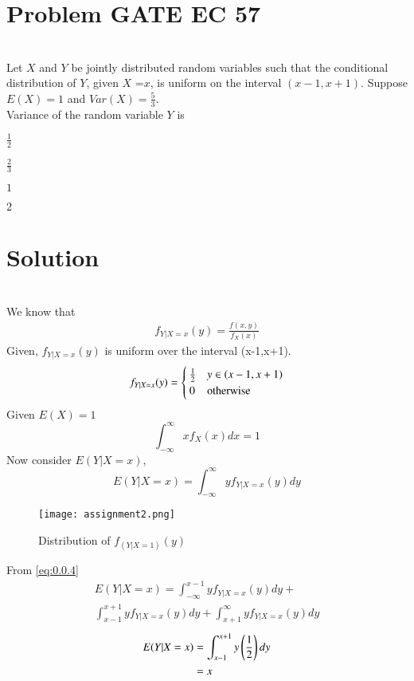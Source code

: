 \documentclass[journal,12pt,twocolumn]{IEEEtran}
\begin{document}
\section*{{Problem GATE EC 57}}\\
Let $X$ and $Y$ be jointly distributed random variables such that the conditional distribution of $Y$, given $X$ =$x$, is uniform on the interval $(x-1,x+1)$. Suppose $E(X)=1$ and $Var(X)=\frac{5}{3}$.
\\
 Variance of the random variable $Y$ is 
\begin{enumerate}[(A)]
\begin{multicols}{2}
\setlength\itemsep{1em}
\item $ \frac{1}{2}$\\
\item $\frac{2}{3}$\\
\item $1$\\
\item $2$
\end{multicols}
\end{enumerate}
\section*{{Solution}}\\
We know that
\begin{align}
    f_{Y|X=x}(y)=\frac{f(x,y)}{f_{X}(x)} \label{eq:0.0.1}
\end{align}
Given, $f_{Y|X=x}(y)$ is uniform over the interval (x-1,x+1).
\begin{align}
    f_{Y|X=x}(y)=
    \begin{cases}
    \frac{1}{2} & y \in \left(x-1,x+1\right)\\
    0 & \text{otherwise}
    \end{cases}\label{eq:0.0.2}
\end{align}
Given $E(X)=1$
\begin{equation}
    \int_{-\infty}^{\infty}x f_{X}(x)dx=1\label{eq:0.0.3}
\end{equation}
Now consider $E(Y|X=x)$,
\begin{equation}
    E(Y|X=x)=\int_{-\infty}^{\infty}y f_{Y|X=x}(y)dy \label{eq:0.0.4}
\end{equation}
\begin{figure}[H]
    \centering
    \texttt{[image: assignment2.png]}
    \caption{Distribution of $f_{(Y|X=1)}(y)$}
\end{figure}
From \eqref{eq:0.0.4}
\begin{multline}
     E(Y|X=x)=\int_{-\infty}^{x-1}yf_{Y|X=x}(y)dy+\\ \int_{x-1}^{x+1}yf_{Y|X=x}(y)dy+\int_{x+1}^{\infty}yf_{Y|X=x}(y)dy
\end{multline}
\begin{align}
     E(Y|X=x)&=\int_{x-1}^{x+1}y\left(\frac{1}{2}\right)dy\\
    &=x
\end{align}
\end{document}

